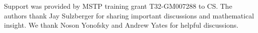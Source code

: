 Support was provided by MSTP training grant T32-GM007288 to CS. The authors thank Jay Sulzberger for sharing important discussions and mathematical insight. We thank Noson Yonofsky and Andrew Yates for helpful discussions.
